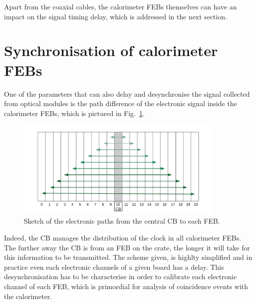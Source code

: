 Apart from the coaxial cables, the calorimeter FEBs themselves can have an impact on the signal timing delay, which is addressed in the next section.

\section{Synchronisation of calorimeter FEBs}
\label{sec:timing_FEB}

One of the parameters that can also delay and desynchronise the signal collected from optical modules is the path difference of the electronic signal inside the calorimeter FEBs, which is pictured in Fig.~\ref{fig:FEB_scheme}.
\begin{figure}[h!]
  \centering
  \includegraphics[width=0.9\textwidth]{commissioning/fig_commissioning/clock_distribution_back_plain.pdf}
  \caption{Sketch of the electronic paths from the central CB to each FEB.
    \label{fig:FEB_scheme}}
\end{figure}
Indeed, the CB manages the distribution of the clock in all calorimeter FEBs.
The further away the CB is from an FEB on the crate, the longer it will take for this information to be transmitted.
The scheme given, is highlty simplified and in practice even each electronic channels of a given board has a delay.
This desynchronisation has to be characterise in order to calibrate each electronic channel of each FEB, which is primordial for analysis of coincidence events with the calorimeter.

